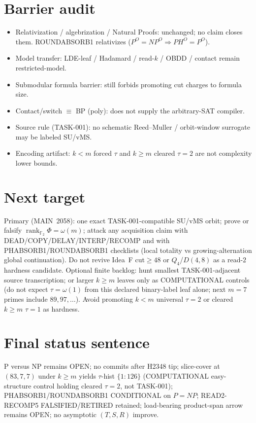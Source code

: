 \documentclass[11pt]{article}
\begin{document}
\section*{Barrier audit}
\begin{itemize}
\item Relativization / algebrization / Natural Proofs: unchanged; no claim closes them.
  ROUNDABSORB1 relativizes ($P^O{=}NP^O\Rightarrow PH^O{=}P^O$).
\item Model transfer: LDE-leaf / Hadamard / read-$k$ / OBDD / contact remain restricted-model.
\item Submodular formula barrier: still forbids promoting cut charges to formula size.
\item Contact/switch $\equiv$ BP (poly): does not supply the arbitrary-SAT compiler.
\item Source rule (TASK-001): no schematic Reed--Muller / orbit-window surrogate may be labeled SU/vMS.
\item Encoding artifact: $k{<}m$ forced $\tau$ and $k{\ge}m$ cleared $\tau{=}2$ are not complexity lower bounds.
\end{itemize}

\section*{Next target}
Primary (MAIN~2058): one exact TASK-001-compatible SU/vMS orbit; prove or falsify
$\operatorname{rank}_{\mathbb F_2}\Phi=\omega(m)$; attack any acquisition claim with
DEAD/COPY/DELAY/INTERP/RECOMP and with PHABSORB1/ROUNDABSORB1 checklists
(local totality vs growing-alternation global continuation).
Do not revive Idea~F cut$\ge48$ or $Q_4$/$D(4,8)$ as a read-$2$ hardness candidate.
Optional finite backlog: hunt smallest TASK-001-adjacent source transcription;
or larger $k{\ge}m$ leaves only as COMPUTATIONAL controls (do not expect $\tau=\omega(1)$
from this declared binary-label leaf alone; next $m{=}7$ primes include $89,97,\ldots$).
Avoid promoting $k{<}m$ universal $\tau{=}2$ or cleared $k{\ge}m$ $\tau{=}1$ as hardness.

\section*{Final status sentence}
P versus NP remains OPEN; no commits after H2348 tip; slice-cover at $(83,7,7)$ under
$k{\ge}m$ yields $\tau$-hist $\{1{:}126\}$ (COMPUTATIONAL easy-structure control holding
cleared $\tau{=}2$, not TASK-001); PHABSORB1/ROUNDABSORB1 CONDITIONAL on $P{=}NP$;
READ2-RECOMP5 FALSIFIED/RETIRED retained; load-bearing product-span arrow remains OPEN;
no asymptotic $(T,S,R)$ improve.
\end{document}
